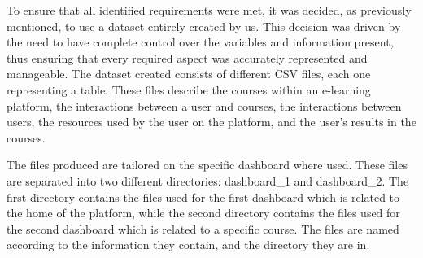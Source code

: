 To ensure that all identified requirements were met, it was decided, 
as previously mentioned, to use a dataset entirely created by us. This decision was driven by the need to have 
complete control over the variables and information present, thus ensuring that every required aspect was 
accurately represented and manageable. The dataset created consists of different CSV files, each one representing a table. 
These files describe the courses within an e-learning platform, the interactions between a user and courses,
the interactions between users, the resources used by the user on the platform, and the user's
results in the courses.

The files produced are tailored on the specific dashboard where used. These files are separated into two different
directories: dashboard\_1 and dashboard\_2. The first directory contains the files used for the first dashboard which is
related to the home of the platform, while the second directory contains the files used for the second dashboard which is
related to a specific course. The files are named according to the information they contain, and the directory they are in.


